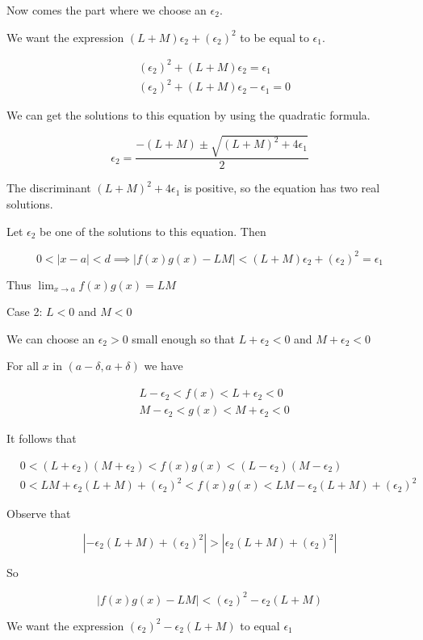 Now comes the part where we choose an $\epsilon_2$.

We want the expression $(L + M)\epsilon_2 + (\epsilon_2)^2$ to be equal to $\epsilon_1$.

\begin{align*}
& (\epsilon_2)^2 + (L + M)\epsilon_2 = \epsilon_1 \\
& (\epsilon_2)^2 + (L + M)\epsilon_2 - \epsilon_1 = 0
\end{align*}

We can get the solutions to this equation by using the quadratic formula.

    $$ \epsilon_2 = \frac{-(L + M) \pm \sqrt{(L + M)^2 + 4\epsilon_1}}{2} $$

The discriminant $(L + M)^2 + 4\epsilon_1$ is positive, so the equation has two real solutions.

Let $\epsilon_2$ be one of the solutions to this equation. Then

    $$ 0 < |x - a| < d \implies |f(x)g(x) - LM| < (L + M)\epsilon_2 + (\epsilon_2)^2 = \epsilon_1 $$

Thus $\lim_{x \rightarrow a} f(x)g(x) = LM$

Case 2: $L < 0$ and $M < 0$

We can choose an $\epsilon_2 > 0$ small enough so that $L + \epsilon_2 < 0$ and $M + \epsilon_2 < 0$

For all $x$ in $(a - \delta, a + \delta)$ we have

\begin{align*}
& L - \epsilon_2 < f(x) < L + \epsilon_2 < 0 \\
& M - \epsilon_2 < g(x) < M + \epsilon_2 < 0
\end{align*}
 
It follows that

\begin{align*}
& 0 < (L + \epsilon_2)(M + \epsilon_2) < f(x)g(x) < (L - \epsilon_2)(M - \epsilon_2) \\
& 0 < LM + \epsilon_2(L + M) + (\epsilon_2)^2 < f(x)g(x) < LM - \epsilon_2(L + M) + (\epsilon_2)^2
\end{align*}

Observe that

    $$ |-\epsilon_2(L + M) + (\epsilon_2)^2| > |\epsilon_2(L + M) + (\epsilon_2)^2| $$

So

    $$ |f(x)g(x) - LM| < (\epsilon_2)^2 - \epsilon_2(L + M) $$

We want the expression $(\epsilon_2)^2 - \epsilon_2(L + M)$ to equal $\epsilon_1$

